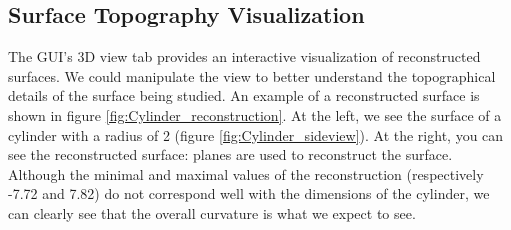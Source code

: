 \documentclass[../main.tex]{subfiles}
\begin{document}
\subsection{Surface Topography Visualization}
\vspace{-15pt}
The GUI's 3D view tab provides an interactive visualization of reconstructed surfaces. We could manipulate the view to better understand the topographical details of the surface being studied. An example of a reconstructed surface is shown in figure \ref{fig:Cylinder_reconstruction}. At the left, we see the surface of a cylinder with a radius of 2 (figure \ref{fig:Cylinder_sideview}). At the right, you can see the reconstructed surface: planes are used to reconstruct the surface. Although the minimal and maximal values of the reconstruction (respectively -7.72 and 7.82) do not correspond well with the dimensions of the cylinder, we can clearly see that the overall curvature is what we expect to see.\\
\vspace{-15pt}
\end{document}

